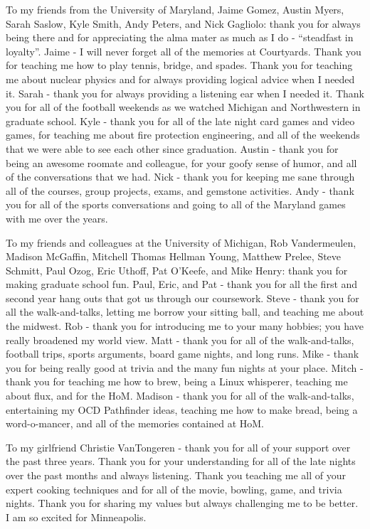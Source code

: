 To my friends from the University of Maryland, Jaime Gomez, Austin Myers, Sarah Saslow,
Kyle Smith, Andy Peters, and Nick Gagliolo: thank you for always being there and for
appreciating the alma mater as much as I do - ``steadfast in loyalty''. Jaime - I will
never forget all of the memories at Courtyards. Thank you for teaching me how to play
tennis, bridge, and spades. Thank you for teaching me about nuclear physics and for
always providing logical advice when I needed it.  Sarah - thank you for always providing
a listening ear when I needed it. Thank you for all of the football weekends as we watched
Michigan and Northwestern in graduate school. Kyle - thank you for all of the late night
card games and video games, for teaching me about fire protection engineering, and all of
the weekends that we were able to see each other since graduation. Austin - thank you for
being an awesome roomate and colleague, for your goofy sense of humor,
and all of the conversations that we had. Nick - thank you for keeping me sane through all
of the courses, group projects, exams, and gemstone activities. Andy - thank you for all
of the sports conversations and going to all of the Maryland games with me over the years.

To my friends and colleagues at the University of Michigan, Rob Vandermeulen, Madison
McGaffin, Mitchell Thomas Hellman Young, Matthew Prelee, Steve Schmitt, Paul Ozog, Eric
Uthoff, Pat O'Keefe, and Mike Henry: thank you for making graduate school fun. Paul, Eric,
and Pat - thank you for all the first and second year hang outs that got us through our
coursework. Steve - thank you for all the walk-and-talks, letting me borrow your sitting
ball, and teaching me about the midwest. Rob - thank you for introducing me to your many
hobbies; you have really broadened my world view. Matt - thank you for all of the
walk-and-talks, football trips, sports arguments, board game nights, and long runs. Mike -
thank you for being really good at trivia and the many fun nights at your place. Mitch -
thank you for teaching me how to brew, being a Linux whisperer, teaching me about flux,
and for the HoM. Madison - thank you for all of the walk-and-talks, entertaining my OCD
Pathfinder ideas, teaching me how to make bread, being a word-o-mancer, and all of the
memories contained at HoM.

To my girlfriend Christie VanTongeren - thank you for all of your support over the past
three years. Thank you for your understanding for all of the late nights over the past
months and always listening. Thank you teaching me all of your expert cooking
techniques and for all of the movie, bowling, game, and trivia nights. Thank you
for sharing my values but always challenging me to be better. I am so excited for
Minneapolis.

